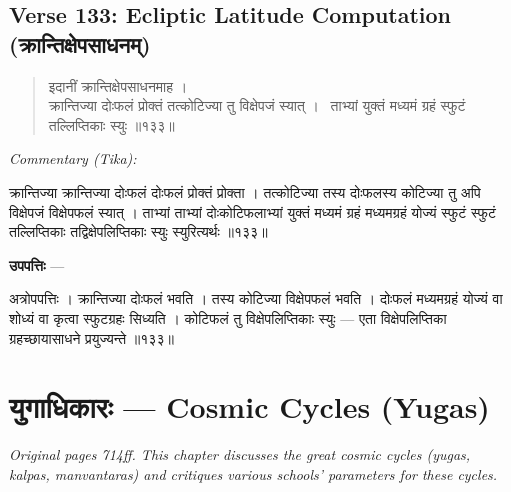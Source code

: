 \documentclass[11pt,a4paper]{article}
\newcommand{\dev}[1]{{\devanagarifont #1}}
\newcommand{\skt}[1]{{\devanagarifont\color{sktcolor} #1}}
\newenvironment{shloka}{%
  \begin{quote}%
  \smallskip%
  \devanagarifont\color{sktcolor}%
}{%
  \smallskip%
  \end{quote}%
}
\newenvironment{tika}{%
  \smallskip%
  \noindent\textit{Commentary (Tika):}\par%
  \smallskip%
  \hindifont\small%
}{%
  \par\smallskip%
}
\newenvironment{upapatti}{%
  \smallskip%
  \noindent\textbf{\devanagarifont उपपत्तिः} — \devanagarifont\small%
}{%
  \par\smallskip%
}
\newcommand{\ednote}[1]{\textcolor{notecolor}{\textit{#1}}}
\begin{document}
\subsection*{Verse 133: Ecliptic Latitude Computation (\dev{क्रान्तिक्षेपसाधनम्})}

\begin{shloka}
\skt{इदानीं क्रान्तिक्षेपसाधनमाह ।}\\[0.5em]
\skt{क्रान्तिज्या दोःफलं प्रोक्तं तत्कोटिज्या तु विक्षेपजं स्यात् ।}\
\skt{ताभ्यां युक्तं मध्यमं ग्रहं स्फुटं तल्लिप्तिकाः स्युः} ॥१३३॥
\end{shloka}

\vspace{0.3cm}
\begin{tika}
\skt{क्रान्तिज्या} क्रान्तिज्या \skt{दोःफलं} दोःफलं \skt{प्रोक्तं} प्रोक्ता । \skt{तत्कोटिज्या} तस्य दोःफलस्य कोटिज्या \skt{तु} अपि \skt{विक्षेपजं} विक्षेपफलं \skt{स्यात्} । \skt{ताभ्यां} ताभ्यां दोःकोटिफलाभ्यां \skt{युक्तं मध्यमं ग्रहं} मध्यमग्रहं योज्यं \skt{स्फुटं} स्फुटं \skt{तल्लिप्तिकाः} तद्विक्षेपलिप्तिकाः \skt{स्युः} स्युरित्यर्थः ॥१३३॥
\end{tika}

\vspace{0.3cm}
\begin{upapatti}
\skt{अत्रोपपत्तिः} । क्रान्तिज्या दोःफलं भवति । तस्य कोटिज्या विक्षेपफलं भवति । दोःफलं मध्यमग्रहं योज्यं वा शोध्यं वा कृत्वा स्फुटग्रहः सिध्यति । कोटिफलं तु विक्षेपलिप्तिकाः स्युः — एता विक्षेपलिप्तिका ग्रहच्छायासाधने प्रयुज्यन्ते ॥१३३॥
\end{upapatti}

\newpage
\section[युगाधिकारः]{\dev{युगाधिकारः} — Cosmic Cycles (Yugas)}
\label{sec:yuga}

\ednote{Original pages 714ff. This chapter discusses the great cosmic cycles (yugas, kalpas, manvantaras) and critiques various schools' parameters for these cycles.}
\end{document}
